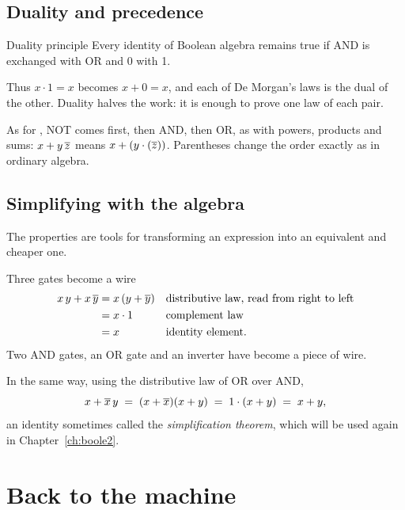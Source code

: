 \subsection{Duality and precedence}

\begin{theorem}{Duality principle}
Every identity of Boolean algebra remains true if AND is exchanged with OR and
0 with 1.
\end{theorem}

Thus $x\cdot 1=x$ becomes $x+0=x$, and each of De Morgan's laws is the dual of
the other. Duality halves the work: it is enough to prove one law of each
pair.

As for , NOT comes first, then AND, then OR, as with powers,
products and sums: $x+y\,\overline{z}$ means $x+(y\cdot(\overline{z}))$. Parentheses
change the order exactly as in ordinary algebra.

\subsection{Simplifying with the algebra}

The properties are tools for transforming an expression into an equivalent
and cheaper one.

\begin{example}{Three gates become a wire}
\begin{align*}
x\,y+x\,\overline{y} &= x\,(y+\overline{y}) && \text{distributive law, read from right to left}\\
 &= x\cdot 1 && \text{complement law}\\
 &= x && \text{identity element.}
\end{align*}
Two AND gates, an OR gate and an inverter have become a piece of wire.
\end{example}

In the same way, using the distributive law of OR over AND,
\begin{equation}\label{eq:b1:simp}
x+\overline{x}\,y \;=\; (x+\overline{x})(x+y) \;=\; 1\cdot(x+y) \;=\; x+y ,
\end{equation}
an identity sometimes called the \emph{simplification theorem}, which will be
used again in Chapter~\ref{ch:boole2}.

\section{Back to the machine}

